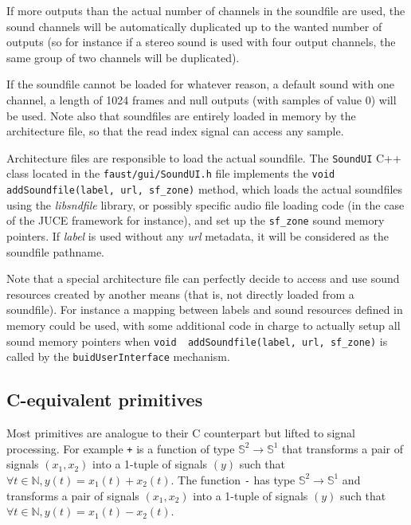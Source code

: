If more outputs than the actual number of channels in the soundfile are used, the sound channels will be automatically duplicated up to the wanted number of outputs (so for instance if a stereo sound is used with four output channels, the same group of two channels will be duplicated).

If the soundfile cannot be loaded for whatever reason, a default sound with one channel, a length of 1024 frames and null outputs (with samples of value 0) will be used. Note also that soundfiles are entirely loaded in memory by the architecture file, so that the read index signal can access any sample.

Architecture files are responsible to load the actual soundfile. The \lstinline'SoundUI' C++ class located in the \lstinline'faust/gui/SoundUI.h' file implements the \lstinline'void  addSoundfile(label, url, sf_zone)' method, which loads the actual soundfiles using the {\it libsndfile} library, or possibly specific audio file loading code (in the case of the JUCE framework for instance), and set up the \lstinline'sf_zone' sound memory pointers. If {\it label} is used without any {\it url} metadata, it will be considered as the soundfile pathname. 

Note that a special architecture file can perfectly decide to access and use sound resources created by another means (that is, not directly loaded from a soundfile). For instance a mapping between labels and sound resources defined in memory could be used, with some additional code in charge to actually setup all sound memory pointers when \lstinline'void  addSoundfile(label, url, sf_zone)'  is called by the \lstinline'buidUserInterface' mechanism.

\subsection{C-equivalent primitives}

Most \faust primitives are analogue to their C counterpart but lifted to signal processing.
For example \lstinline|+| is a function of type $\mathbb{S}^{2}\rightarrow\mathbb{S}^{1}$ that transforms a pair of signals $(x_1,x_2)$ into a 1-tuple of signals $(y)$ such that $\forall t\in\mathbb{N}, y(t)=x_{1}(t)+x_{2}(t)$. The function \lstinline|-| has type $\mathbb{S}^{2}\rightarrow\mathbb{S}^{1}$ and transforms a pair of signals $(x_1,x_2)$ into a 1-tuple of signals $(y)$ such that $\forall t\in\mathbb{N}, y(t)=x_{1}(t)-x_{2}(t)$. 

